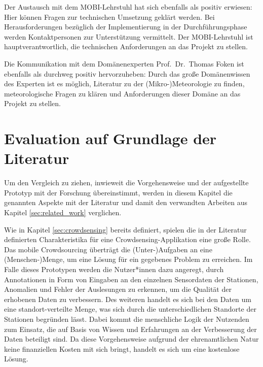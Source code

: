 Der Austausch mit dem \ac{MOBI}-Lehrstuhl hat sich ebenfalls als positiv erwiesen: Hier können Fragen zur technischen Umsetzung geklärt werden. Bei Herausforderungen bezüglich der Implementierung in der Durchführungsphase werden Kontaktpersonen zur Unterstützung vermittelt. Der \ac{MOBI}-Lehrstuhl ist hauptverantwortlich, die technischen Anforderungen an das Projekt zu stellen.

Die Kommunikation mit dem Domänenexperten Prof.\ Dr.\ Thomas Foken ist ebenfalls als durchweg positiv hervorzuheben: Durch das große Domänenwissen des Experten ist es möglich, Literatur zu der (Mikro-)Meteorologie zu finden, meteorologische Fragen zu klären und Anforderungen dieser Domäne an das Projekt zu stellen.

\section{Evaluation auf Grundlage der Literatur}
\label{sec:evaluationliteratur}
Um den Vergleich zu ziehen, inwieweit die Vorgehensweise und der aufgestellte Prototyp mit der Forschung übereinstimmt, werden in diesem Kapitel die genannten Aspekte mit der Literatur und damit den verwandten Arbeiten aus Kapitel \ref{sec:related_work} verglichen.

Wie in Kapitel \ref{sec:crowdsensing} bereits definiert, spielen die in der Literatur definierten Charakteristika für eine Crowdsensing-Applikation eine große Rolle. Das mobile Crowdsourcing überträgt die (Unter-)Aufgaben an eine (Menschen-)Menge, um eine Lösung für ein gegebenes Problem zu erreichen. Im Falle dieses Prototypen werden die Nutzer*innen dazu angeregt, durch Annotationen in Form von Eingaben an den einzelnen Sensordaten der Stationen, Anomalien und Fehler der Auslesungen zu erkennen, um die Qualität der erhobenen Daten zu verbessern. Des weiteren handelt es sich bei den Daten um eine standort-verteilte Menge, was sich durch die unterschiedlichen Standorte der Stationen begründen lässt. Dabei kommt die menschliche Logik der Nutzenden zum Einsatz, die auf Basis von Wissen und Erfahrungen an der Verbesserung der Daten beteiligt sind. Da diese Vorgehensweise aufgrund der ehrenamtlichen Natur keine finanziellen Kosten mit sich bringt, handelt es sich um eine kostenlose Lösung.

